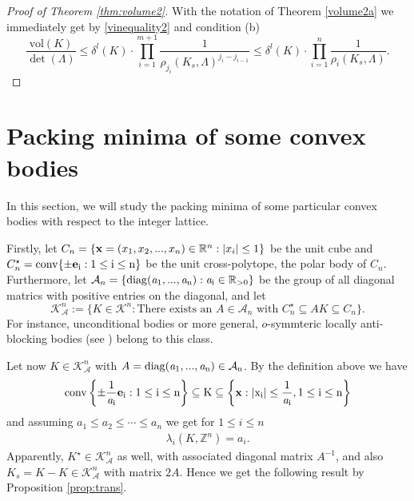 \documentclass{amsart}
\theoremstyle{definition}
\theoremstyle{remark}
\numberwithin{equation}{section}
\begin{document}
\begin{proof}[Proof of Theorem \ref{thm:volume2}] With the notation of Theorem \ref{volume2a} we immediately get by \eqref{vinequality2} and condition (b)
\begin{equation*}
    \frac{\mathrm{vol}(K)}{\det(\Lambda)}\le\delta^l(K)\cdot\overset{m+1}{\underset{i=1}{\prod}}\frac1{\rho_{j_{i}}(K_s,\Lambda)^{j_{i}-j_{i-1}}}\leq \delta^l(K)\cdot\overset{n}{\underset{i=1}{\prod}}\frac1{\rho_{{i}}(K_s,\Lambda)}.
\end{equation*} 
\end{proof}


\section{\bf Packing minima of some convex bodies}\label{section:TnZn}

In this section, we will study the packing minima of some particular convex bodies with respect to the integer lattice. 

Firstly, let $C_n=\{{\bf x}=(x_1,x_2,...,x_n)\in\mathbb{R}^n:|x_i|\le1\}$ be the unit cube and $C_n^\star=\rm{conv}\{\pm{\bf e}_i:1\le i\le n\}$ be the unit cross-polytope, the polar body of $C_n$. Furthermore, let $\mathcal{A}_n=\{\rm{diag}({\it a}_1,...,{\it a}_n):{\it a}_i\in\mathbb{R}_{>0}\}$ be the group of all diagonal matrics with positive entries on the diagonal, and let
\begin{equation*}
    \mathcal{K}^n_\mathcal{A}:=\{K\in\mathcal{K}^n:\text{There exists an }A\in\mathcal{A}_n\text{ with }C_n^\star\subseteq AK\subseteq C_n\}.
\end{equation*}
For instance, unconditional bodies or more general, $o$-symmteric locally anti-blocking bodies (see \cite{aass2023,kos2020}) belong to this class.

Let now $K\in\mathcal{K}^n_\mathcal{A}$ with $A=\rm{diag}({\it a}_1,...,{\it a}_n)\in\mathcal{A}_n$. By the definition above we have
\begin{align*}
    \rm{conv}\left\{\pm\frac{1}{{\it a}_i}{\bf e}_i:1\le i\le n\right\}\subseteq K\subseteq\left\{{\bf x}:|x_i|\le\frac{1}{{\it a}_i},1\le i\le n\right\}
\end{align*}
and assuming $a_1\le a_2\le\cdots\le a_n$ we get for $1\le i\le n$
\begin{align*}
    \lambda_i(K,\mathbb{Z}^n)=a_i.
\end{align*}
Apparently, $K^\star\in\mathcal{K}^n_\mathcal{A}$ as well, with associated diagonal matrix $A^{-1}$, and also $K_s=K-K\in\mathcal{K}^n_\mathcal{A}$ with matrix $2A$. Hence we get the following result by Proposition \ref{prop:trans}. 
\end{document}
